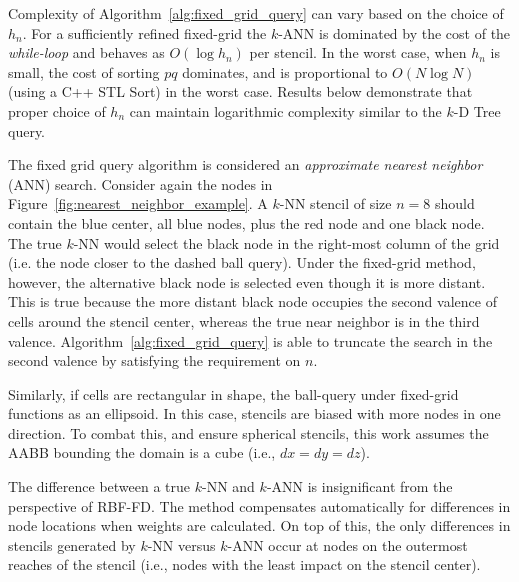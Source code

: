 \documentclass{report}
\begin{document}
Complexity of Algorithm~\ref{alg:fixed_grid_query} can vary based on the choice of $h_n$. For a sufficiently refined fixed-grid the $k$-ANN is dominated by the cost of the \emph{while-loop} and behaves as $O(\log h_n)$ per stencil. In the worst case, when $h_n$ is small, the cost of sorting $pq$ dominates, and is proportional to $O(N \log N)$ (using a C++ STL Sort) in the worst case. %
Results below demonstrate that proper choice of $h_n$ can maintain logarithmic complexity similar to the $k$-D Tree query. 


The fixed grid query algorithm is considered an \emph{approximate nearest neighbor} (ANN) search. Consider again the nodes in Figure~\ref{fig:nearest_neighbor_example}. A $k$-NN stencil of size $n=8$ should contain the blue center, all blue nodes, plus the red node and one black node. The true $k$-NN would select the black node in the right-most column of the grid (i.e. the node closer to the dashed ball query). Under the fixed-grid method, however, the alternative black node is selected even though it is more distant. This is true because the more distant black node occupies the second valence of cells around the stencil center, whereas the true near neighbor is in the third valence. Algorithm~\ref{alg:fixed_grid_query} is able to truncate the search in the second valence by satisfying the requirement on $n$. 

Similarly, if cells are rectangular in shape, the ball-query under fixed-grid functions as an ellipsoid. In this case, stencils are biased with more nodes in one direction. To combat this, and ensure spherical stencils, this work assumes the AABB bounding the domain is a cube (i.e., $dx = dy = dz$). 

The difference between a true $k$-NN and $k$-ANN is insignificant from the perspective of RBF-FD. The method compensates automatically for differences in node locations when weights are calculated. On top of this, the only differences in stencils generated by $k$-NN versus $k$-ANN occur at nodes on the outermost reaches of the stencil (i.e., nodes with the least impact on the stencil center).


\end{document}
